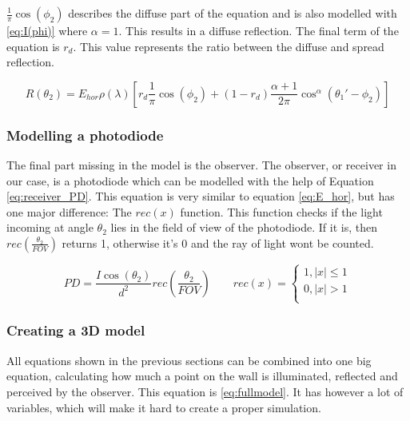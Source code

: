$\frac{1}{\pi}\cos(\phi_2)$ describes the diffuse part of the equation and is also modelled with \ref{eq:I(phi)} where $\alpha = 1$. This results in a diffuse reflection. The final term of the equation is $r_d$. This value represents the ratio between the diffuse and spread reflection.

\begin{equation}
\label{eq:Reflection}
R(\theta_2) = E_{hor}\rho(\lambda)\left[ r_{d} \frac{1}{\pi}\cos(\phi_2)+ (1-r_{d})\frac{\alpha+1}{2\pi}\cos^\alpha(\theta_1'-\phi_2) \right]
\end{equation}

\subsubsection{Modelling a photodiode}
The final part missing in the model is the observer. The observer, or receiver in our case, is a photodiode which can be modelled with the help of Equation \ref{eq:receiver_PD}. This equation is very similar to equation \ref{eq:E_hor}, but has one major difference: The $rec(x)$ function. This function checks if the light incoming at angle $\theta_2$ lies in the field of view of the photodiode. If it is, then $rec \left(\frac{\theta_2}{FOV}\right)$ returns 1, otherwise it's 0 and the ray of light wont be counted.

\begin{equation}
	\label{eq:receiver_PD}
	PD = \frac{I\cos(\theta_2)}{d^2} rec \left(\frac{\theta_2}{FOV}\right)
	\qquad
	rec(x) = 
		\begin{cases}
		1, |x|\leq 1 \\
		0, |x| > 1 \\
		\end{cases}
\end{equation}

\subsubsection{Creating a 3D model}
All equations shown in the previous sections can be combined into one big equation, calculating how much a point on the wall is illuminated, reflected and perceived by the observer. This equation is \ref{eq:fullmodel}. It has however a lot of variables, which will make it hard to create a proper simulation. 

